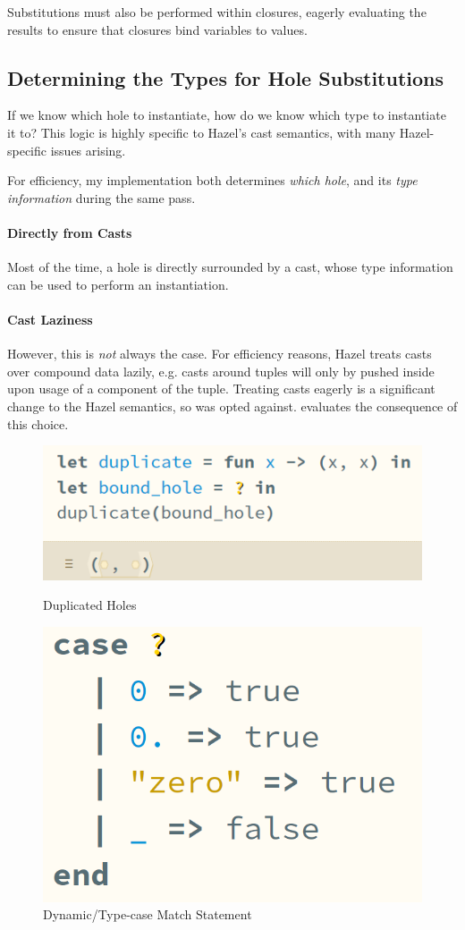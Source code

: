 Substitutions must also be performed within closures, eagerly evaluating the results to ensure that closures bind variables to values. 

\subsection{Determining the Types for Hole Substitutions}
\label{sec:TypesForHoles}
If we know which hole to instantiate, how do we know which type to instantiate it to? This logic is highly specific to Hazel's cast semantics, with many Hazel-specific issues arising.

For efficiency, my implementation both determines \textit{which hole}, and its \textit{type information} during the same pass.

\paragraph{Directly from Casts}
Most of the time, a hole is directly surrounded by a cast, whose type information can be used to perform an instantiation.

\paragraph{Cast Laziness}\label{sec:CastLaziness}
However, this is \textit{not} always the case. For efficiency reasons, Hazel treats casts over compound data lazily, e.g. casts around tuples will only by pushed inside upon usage of a component of the tuple. Treating casts eagerly is a significant change to the Hazel semantics, so was opted against.  evaluates the consequence of this choice.

\begin{figure}
\centering
\begin{minipage}{.45\textwidth}
\centering
\includegraphics[width=0.8\linewidth]{Media/Figures/duplicate_hole}
\caption{Duplicated Holes}
\label{fig:HoleDuplication}
\end{minipage}%
\begin{minipage}{.45\textwidth}
  \centering
\includegraphics[width=0.5\linewidth]{Media/Figures/dynmatch}
\caption{Dynamic/Type-case Match Statement}
\label{fig:DynamicPatternMatching}
\end{minipage}
\end{figure}

